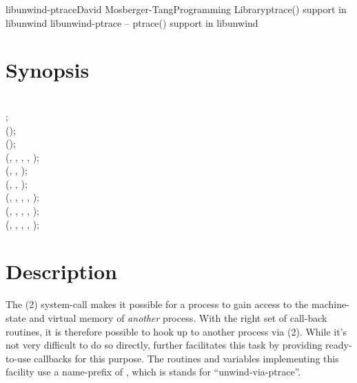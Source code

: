 \documentclass{article}
\begin{document}
\begin{Name}{3}{libunwind-ptrace}{David Mosberger-Tang}{Programming Library}{ptrace() support in libunwind}
  libunwind-ptrace -- ptrace() support in libunwind
\end{Name}

\section{Synopsis}

\\

\noindent
{} ;\\

();\\
\noindent
{} ();\\

\noindent
{} (, , , , );\\
\noindent
{} (, , );\\
\noindent
{} (, , );\\
\noindent
{} (, , , , );\\
\noindent
{} (, , , , );\\
\noindent
{} (, , , , );\\

\section{Description}

The (2) system-call makes it possible for a process to
gain access to the machine-state and virtual memory of \emph{another}
process.  With the right set of call-back routines, it is therefore
possible to hook up  to another process via
(2).  While it's not very difficult to do so directly,
 further facilitates this task by providing
ready-to-use callbacks for this purpose.  The routines and variables
implementing this facility use a name-prefix of , which is
stands for ``unwind-via-ptrace''.
\end{document}
